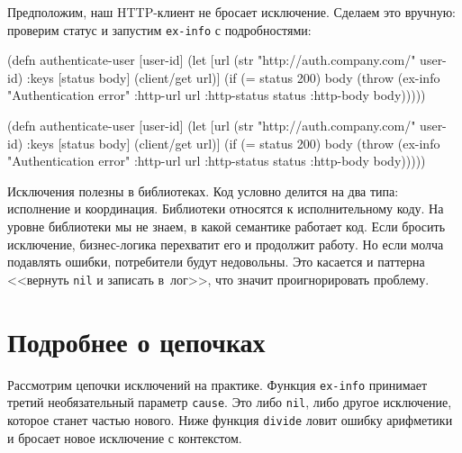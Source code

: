 Предположим, наш HTTP-клиент не бросает исключение. Сделаем это вручную:
проверим статус и запустим \verb|ex-info| с подробностями:


\ifx\devicetype\mobile

\begin{english}
  \begin{clojure}
(defn authenticate-user [user-id]
  (let [url (str
              "http://auth.company.com/"
              user-id)
        {:keys [status body]}
        (client/get url)]
    (if (= status 200)
      body
      (throw (ex-info
               "Authentication error"
               {:http-url url
                :http-status status
                :http-body body})))))
  \end{clojure}
\end{english}

\else

\begin{english}
  \begin{clojure}
(defn authenticate-user [user-id]
  (let [url (str "http://auth.company.com/" user-id)
        {:keys [status body]} (client/get url)]
    (if (= status 200)
      body
      (throw (ex-info "Authentication error"
                      {:http-url url
                       :http-status status
                       :http-body body})))))
  \end{clojure}
\end{english}

\fi

Исключения полезны в библиотеках. Код условно делится на два типа: исполнение и
координация. Библиотеки относятся к исполнительному коду. На уровне библиотеки
мы не знаем, в какой семантике работает код. Если бросить исключение,
бизнес-логика перехватит его и продолжит работу. Но если молча подавлять ошибки,
потребители будут недовольны. Это касается и паттерна <<вернуть \verb|nil| и
записать в~лог>>, что значит проигнорировать проблему.

\section{Подробнее о цепочках}


Рассмотрим цепочки исключений на практике. Функция \verb|ex-info|
принимает третий необязательный параметр \verb|cause|. Это либо \verb|nil|,
либо другое исключение, которое станет частью нового. Ниже функция
\verb|divide| ловит ошибку арифметики и бросает новое исключение с контекстом.

